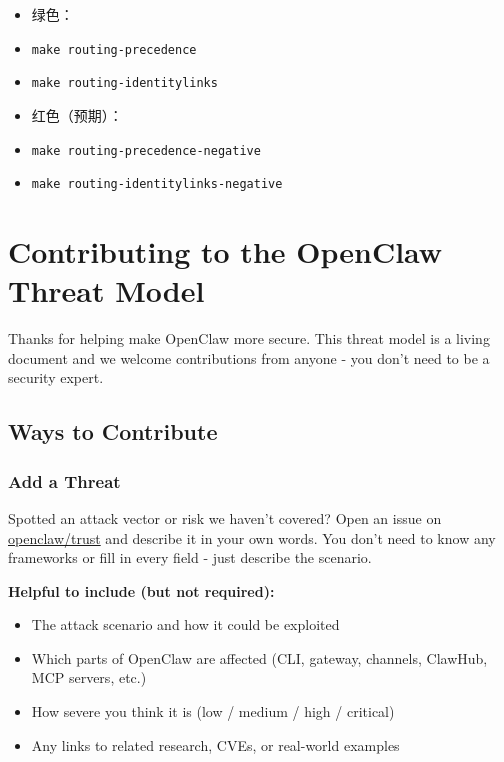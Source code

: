 \begin{itemize}
  \item 绿色：
  \item \texttt{make routing-precedence}
  \item \texttt{make routing-identitylinks}
  \item 红色（预期）：
  \item \texttt{make routing-precedence-negative}
  \item \texttt{make routing-identitylinks-negative}
\end{itemize}



\clearpage
\section{Contributing to the OpenClaw Threat Model}


Thanks for helping make OpenClaw more secure. This threat model is a living document and we welcome contributions from anyone - you don't need to be a security expert.

\subsection{Ways to Contribute}


\subsubsection{Add a Threat}


Spotted an attack vector or risk we haven't covered? Open an issue on \href{https://github.com/openclaw/trust/issues}{openclaw/trust} and describe it in your own words. You don't need to know any frameworks or fill in every field - just describe the scenario.

\textbf{Helpful to include (but not required):}

\begin{itemize}
  \item The attack scenario and how it could be exploited
  \item Which parts of OpenClaw are affected (CLI, gateway, channels, ClawHub, MCP servers, etc.)
  \item How severe you think it is (low / medium / high / critical)
  \item Any links to related research, CVEs, or real-world examples
\end{itemize}


